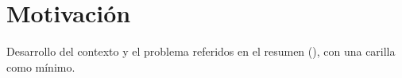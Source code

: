 \section{Motivación}
\label{sec:motivation}

\begin{shaded}
Desarrollo del contexto y el problema referidos en el resumen (), con una carilla como mínimo.
\end{shaded}
